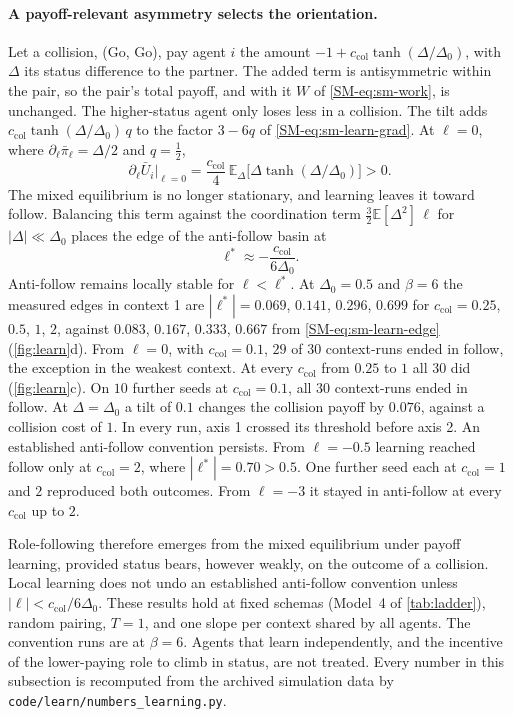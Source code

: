 \documentclass[
  aps,prx,
  preprint,
  superscriptaddress,
  nofootinbib
]{revtex4-2}
\newcommand{\pibar}{\bar\pi}
\begin{document}
\paragraph{A payoff-relevant asymmetry selects the orientation.} Let a collision, (Go, Go), pay agent $i$ the amount $-1+c_{\mathrm{col}}\tanh(\Delta/\Delta_0)$, with $\Delta$ its status difference to the partner. The added term is antisymmetric within the pair, so the pair's total payoff, and with it $W$ of \cref{SM-eq:sm-work}, is unchanged. The higher-status agent only loses less in a collision. The tilt adds $c_{\mathrm{col}}\tanh(\Delta/\Delta_0)\,q$ to the factor $3-6q$ of \cref{SM-eq:sm-learn-grad}. At $\ell=0$, where $\partial_\ell\pibar_\ell=\Delta/2$ and $q=\tfrac12$,
\begin{equation}\label{SM-eq:sm-learn-tilt}
\partial_\ell\bar U_i\big|_{\ell=0}=\frac{c_{\mathrm{col}}}{4}\,\mathbb E_\Delta\bigl[\Delta\tanh(\Delta/\Delta_0)\bigr]>0 .
\end{equation}
The mixed equilibrium is no longer stationary, and learning leaves it toward follow. Balancing this term against the coordination term $\tfrac32\mathbb E[\Delta^2]\,\ell$ for $|\Delta|\ll\Delta_0$ places the edge of the anti-follow basin at
\begin{equation}\label{SM-eq:sm-learn-edge}
\ell^\ast\approx-\frac{c_{\mathrm{col}}}{6\Delta_0}.
\end{equation}
Anti-follow remains locally stable for $\ell<\ell^\ast$. At $\Delta_0=0.5$ and $\beta=6$ the measured edges in context 1 are $|\ell^\ast|=0.069$, $0.141$, $0.296$, $0.699$ for $c_{\mathrm{col}}=0.25$, $0.5$, $1$, $2$, against $0.083$, $0.167$, $0.333$, $0.667$ from \cref{SM-eq:sm-learn-edge} (\cref{fig:learn}d). From $\ell=0$, with $c_{\mathrm{col}}=0.1$, $29$ of $30$ context-runs ended in follow, the exception in the weakest context. At every $c_{\mathrm{col}}$ from $0.25$ to $1$ all $30$ did (\cref{fig:learn}c). On $10$ further seeds at $c_{\mathrm{col}}=0.1$, all $30$ context-runs ended in follow. At $\Delta=\Delta_0$ a tilt of $0.1$ changes the collision payoff by $0.076$, against a collision cost of $1$. In every run, axis 1 crossed its threshold before axis 2. An established anti-follow convention persists. From $\ell=-0.5$ learning reached follow only at $c_{\mathrm{col}}=2$, where $|\ell^\ast|=0.70>0.5$. One further seed each at $c_{\mathrm{col}}=1$ and $2$ reproduced both outcomes. From $\ell=-3$ it stayed in anti-follow at every $c_{\mathrm{col}}$ up to $2$.

Role-following therefore emerges from the mixed equilibrium under payoff learning, provided status bears, however weakly, on the outcome of a collision. Local learning does not undo an established anti-follow convention unless $|\ell|<c_{\mathrm{col}}/6\Delta_0$. These results hold at fixed schemas (Model~4 of \cref{tab:ladder}), random pairing, $T=1$, and one slope per context shared by all agents. The convention runs are at $\beta=6$. Agents that learn independently, and the incentive of the lower-paying role to climb in status, are not treated. Every number in this subsection is recomputed from the archived simulation data by \texttt{code/learn/numbers\_learning.py}.
\end{document}
